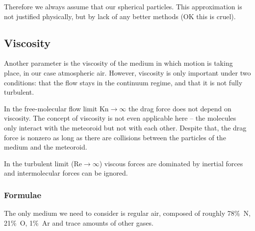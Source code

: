         Therefore we always assume that our spherical particles.
        This approximation is not justified physically, but by lack of any better methods (OK this is cruel).

    \subsection{Viscosity} \label{fdv}
        Another parameter is the viscosity of the medium in which
        motion is taking place, in our case atmospheric air.
        However, viscosity is only important under two conditions: that the flow stays
        in the continuum regime, and that it is not fully turbulent.

        In the free-molecular flow limit $\mathrm{Kn} \to \infty$ the drag force does not
        depend on viscosity. The concept of viscosity is not even applicable here -- the
        molecules only interact with the meteoroid but not with each other.
        Despite that, the drag force is nonzero as long as there are collisions
        between the particles of the medium and the meteoroid.

        In the turbulent limit ($\mathrm{Re} \to \infty$) viscous forces are dominated
        by inertial forces and intermolecular forces can be ignored.

        \subsubsection{Formulae} \label{fdvf}
            The only medium we need to consider is regular air, composed of roughly 78\%~N,
            21\%~O, 1\%~Ar and trace amounts of other gases.

